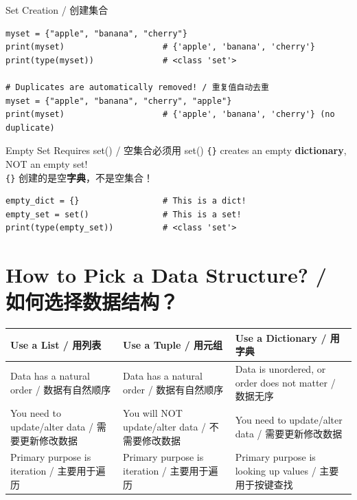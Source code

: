 \documentclass[11pt,a4paper]{article}
\begin{document}
\begin{examplebox}{Set Creation / 创建集合}
\begin{lstlisting}
myset = {"apple", "banana", "cherry"}
print(myset)                    # {'apple', 'banana', 'cherry'}
print(type(myset))              # <class 'set'>

# Duplicates are automatically removed! / 重复值自动去重
myset = {"apple", "banana", "cherry", "apple"}
print(myset)                    # {'apple', 'banana', 'cherry'} (no duplicate)
\end{lstlisting}
\end{examplebox}

\begin{warning}{Empty Set Requires set() / 空集合必须用 set()}
    \texttt{\{\}} creates an empty \textbf{dictionary}, NOT an empty set! \\
    \texttt{\{\}} 创建的是空\textbf{字典}，不是空集合！
    \begin{lstlisting}
empty_dict = {}                 # This is a dict!
empty_set = set()               # This is a set!
print(type(empty_set))          # <class 'set'>
    \end{lstlisting}
\end{warning}

\section{How to Pick a Data Structure? / 如何选择数据结构？}

\begin{table}[h]
\centering
\renewcommand{\arraystretch}{1.8}
\begin{tabular}{@{}p{4cm}p{4cm}p{4cm}@{}}
\toprule
\textbf{Use a List / 用列表} & \textbf{Use a Tuple / 用元组} & \textbf{Use a Dictionary / 用字典} \\ \midrule
Data has a natural order / 数据有自然顺序 & Data has a natural order / 数据有自然顺序 & Data is unordered, or order does not matter / 数据无序 \\
You need to update/alter data / 需要更新修改数据 & You will NOT update/alter data / 不需要修改数据 & You need to update/alter data / 需要更新修改数据 \\
Primary purpose is iteration / 主要用于遍历 & Primary purpose is iteration / 主要用于遍历 & Primary purpose is looking up values / 主要用于按键查找 \\ \bottomrule
\end{tabular}
\end{table}
\end{document}
